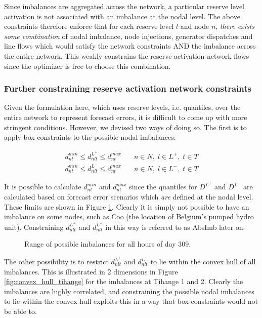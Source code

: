 \documentclass[number,times]{elsarticle}
\begin{document}
Since imbalances are aggregated across the network, a particular reserve level activation is not associated with an imbalance at the nodal level. The above constraints therefore enforce that for each reserve level $l$ and node $n$, \emph{there exists some combination} of nodal imbalance, node injections, generator dispatches and line flows which would satisfy the network constraints AND the imbalance across the entire network. This weakly constrains the reserve activation network flows since the optimizer is free to choose this combination.

\subsubsection{Further constraining reserve activation network constraints} \label{sec:further_constraining_operating_reserve_network_activation_constraints}

Given the formulation here, which uses reserve levels, i.e. quantiles, over the entire network to represent forecast errors, it is difficult to come up with more stringent conditions. However, we devised two ways of doing so. The first is to apply box constraints to the possible nodal imbalances:

\begin{align}
    d_{nt}^{min} \leq d_{nlt}^{L^+} \leq d_{nt}^{max} & \quad n \in N, \; l \in L^+, \; t \in T \\
    d_{nt}^{min} \leq d_{nlt}^{L^-} \leq d_{nt}^{max} & \quad n \in N, \; l \in L^-, \; t \in T
\end{align}

It is possible to calculate $d_{nt}^{min}$ and $d_{nt}^{max}$ since the quantiles for $D^{L^+}$ and $D^{L^-}$ are calculated based on forecast error scenarios which \emph{are} defined at the nodal level. These limits are shown in Figure \ref{fig:imbalance_range}. Clearly it is simply not possible to have an imbalance on some nodes, such as Coo (the location of Belgium's pumped hydro unit). Constraining $d_{nlt}^{L^+}$ and $d_{nlt}^{L^-}$ in this way is referred to as AbsImb later on.

\begin{figure}[ht]
    \centering
    \caption{Range of possible imbalances for all hours of day 309.\label{fig:imbalance_range}}
\end{figure}

The other possibility is to restrict $d_{nlt}^{L^+}$ and $d_{nlt}^{L^-}$ to lie within the convex hull of all imbalances. This is illustrated in 2 dimensions in Figure \ref{fig:convex_hull_tihange} for the imbalances at Tihange 1 and 2. Clearly the imbalances are highly correlated, and constraining the possible nodal imbalances to lie within the convex hull exploits this in a way that box constraints would not be able to.
\end{document}

